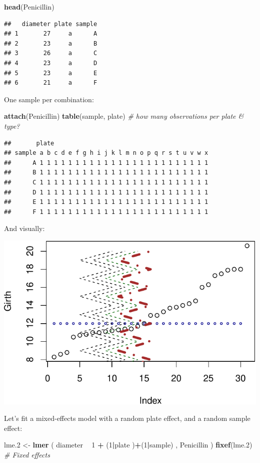 \documentclass[]{book}
\newenvironment{Shaded}{\begin{snugshade}}{\end{snugshade}}
\newcommand{\KeywordTok}[1]{\textcolor[rgb]{0.13,0.29,0.53}{\textbf{#1}}}
\newcommand{\DecValTok}[1]{\textcolor[rgb]{0.00,0.00,0.81}{#1}}
\newcommand{\StringTok}[1]{\textcolor[rgb]{0.31,0.60,0.02}{#1}}
\newcommand{\CommentTok}[1]{\textcolor[rgb]{0.56,0.35,0.01}{\textit{#1}}}
\newcommand{\OperatorTok}[1]{\textcolor[rgb]{0.81,0.36,0.00}{\textbf{#1}}}
\newcommand{\NormalTok}[1]{#1}
\theoremstyle{definition}
\theoremstyle{definition}
\theoremstyle{definition}
\theoremstyle{remark}
\begin{document}
\begin{Shaded}
\begin{Highlighting}[]
\KeywordTok{head}\NormalTok{(Penicillin)}
\end{Highlighting}
\end{Shaded}

\begin{verbatim}
##   diameter plate sample
## 1       27     a      A
## 2       23     a      B
## 3       26     a      C
## 4       23     a      D
## 5       23     a      E
## 6       21     a      F
\end{verbatim}

One sample per combination:

\begin{Shaded}
\begin{Highlighting}[]
\KeywordTok{attach}\NormalTok{(Penicillin)}
\KeywordTok{table}\NormalTok{(sample, plate) }\CommentTok{# how many observations per plate & type?}
\end{Highlighting}
\end{Shaded}

\begin{verbatim}
##       plate
## sample a b c d e f g h i j k l m n o p q r s t u v w x
##      A 1 1 1 1 1 1 1 1 1 1 1 1 1 1 1 1 1 1 1 1 1 1 1 1
##      B 1 1 1 1 1 1 1 1 1 1 1 1 1 1 1 1 1 1 1 1 1 1 1 1
##      C 1 1 1 1 1 1 1 1 1 1 1 1 1 1 1 1 1 1 1 1 1 1 1 1
##      D 1 1 1 1 1 1 1 1 1 1 1 1 1 1 1 1 1 1 1 1 1 1 1 1
##      E 1 1 1 1 1 1 1 1 1 1 1 1 1 1 1 1 1 1 1 1 1 1 1 1
##      F 1 1 1 1 1 1 1 1 1 1 1 1 1 1 1 1 1 1 1 1 1 1 1 1
\end{verbatim}

And visually:

\includegraphics[width=0.5\linewidth]{Rcourse_files/figure-latex/unnamed-chunk-203-1}

Let's fit a mixed-effects model with a random plate effect, and a random
sample effect:

\begin{Shaded}
\begin{Highlighting}[]
\NormalTok{lme.}\DecValTok{2}\NormalTok{ <-}\StringTok{ }\KeywordTok{lmer}\NormalTok{ ( diameter }\OperatorTok{~}\StringTok{  }\DecValTok{1}  \OperatorTok{+}\StringTok{ }\NormalTok{(}\DecValTok{1}\OperatorTok{|}\NormalTok{plate )}\OperatorTok{+}\NormalTok{(}\DecValTok{1}\OperatorTok{|}\NormalTok{sample) , Penicillin )}
\KeywordTok{fixef}\NormalTok{(lme.}\DecValTok{2}\NormalTok{) }\CommentTok{# Fixed effects}
\end{Highlighting}
\end{Shaded}
\end{document}
